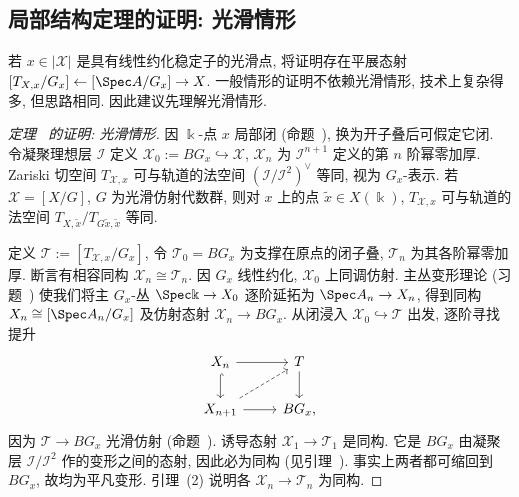 \subsection{局部结构定理的证明: 光滑情形}\label{src:7.7.3-subsection}
若 $x\in|\mathcal X|$ 是具有线性约化稳定子的光滑点, 将证明存在平展态射 $[T_{\mathcal X,x}/G_x]\leftarrow[\Spec A/G_x]\to\mathcal X$. 一般情形的证明不依赖光滑情形, 技术上复杂得多, 但思路相同. 因此建议先理解光滑情形.
\begin{proof}[定理~ 的证明: 光滑情形]
因 $\Bbbk$-点 $x$ 局部闭 (命题~), 换为开子叠后可假定它闭. 令凝聚理想层 $\mathcal I$ 定义 $\mathcal X_0:=BG_x\hookrightarrow\mathcal X$, $\mathcal X_n$ 为 $\mathcal I^{n+1}$ 定义的第 $n$ 阶幂零加厚. Zariski 切空间 $T_{\mathcal X,x}$ 可与轨道的法空间 $(\mathcal I/\mathcal I^2)^\vee$ 等同, 视为 $G_x$-表示. 若 $\mathcal X=[X/G]$, $G$ 为光滑仿射代数群, 则对 $x$ 上的点 $\widetilde x\in X(\Bbbk)$, $T_{\mathcal X,x}$ 可与轨道的法空间 $T_{X,\widetilde x}/T_{G\widetilde x,\widetilde x}$ 等同.

定义 $\mathcal T:=[T_{\mathcal X,x}/G_x]$, 令 $\mathcal T_0=BG_x$ 为支撑在原点的闭子叠, $\mathcal T_n$ 为其各阶幂零加厚. 断言有相容同构 $\mathcal X_n\cong\mathcal T_n$. 因 $G_x$ 线性约化, $\mathcal X_0$ 上同调仿射. 主丛变形理论 (习题~) 使我们将主 $G_x$-丛 $\Spec\Bbbk\to\mathcal X_0$ 逐阶延拓为 $\Spec A_n\to\mathcal X_n$, 得到同构 $\mathcal X_n\cong[\Spec A_n/G_x]$ 及仿射态射 $\mathcal X_n\to BG_x$. 从闭浸入 $\mathcal X_0\hookrightarrow\mathcal T$ 出发, 逐阶寻找提升
\begin{align*}
\begin{tikzcd}[ampersand replacement=\&]
\mathcal X_n\arrow[r]\arrow[d,hook]\&\mathcal T\arrow[d]\\
\mathcal X_{n+1}\arrow[r]\arrow[ur,dashed]\&BG_x,
\end{tikzcd}
\end{align*}
因为 $\mathcal T\to BG_x$ 光滑仿射 (命题~). 诱导态射 $\mathcal X_1\to\mathcal T_1$ 是同构. 它是 $BG_x$ 由凝聚层 $\mathcal I/\mathcal I^2$ 作的变形之间的态射, 因此必为同构 (见引理~). 事实上两者都可缩回到 $BG_x$, 故均为平凡变形. 引理~(2) 说明各 $\mathcal X_n\to\mathcal T_n$ 为同构.


\end{proof}
